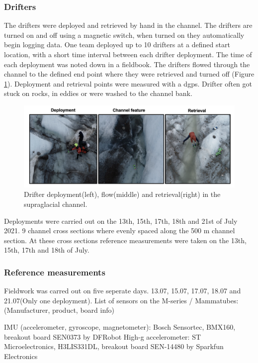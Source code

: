 \subsubsection{Drifters}
The drifters were deployed and retrieved by hand in the channel. The drifters are turned on and off using a magnetic switch, when turned on they automatically begin logging data. One team deployed up to 10 drifters at a defined start location, with a short time interval between each drifter deployment. The time of each deployment was noted down in a fieldbook. The drifters flowed through the channel to the defined end point where they were retrieved and turned off (Figure \ref{fig:deployment_retrieval}). Deployment and retrieval points were measured with a dgps. Drifter often got stuck on rocks, in eddies or were washed to the channel bank.  
\begin{figure}[h]
    \centering
    \includegraphics[width = 12cm]{figures/Methods/deployment_channel_retrieval.png}
    \caption{Drifter deployment(left), flow(middle) and retrieval(right) in the supraglacial channel.}
    \label{fig:deployment_retrieval}
\end{figure}

\newline
\newline

Deployments were carried out on the 13th, 15th, 17th, 18th and 21st of July 2021.
9 channel cross sections where evenly spaced along the 500 m channel section. At these cross sections reference measurements were taken on the 13th, 15th, 17th and 18th of July. 
\subsubsection{Reference measurements}

Fieldwork was carred out on five seperate days. 13.07, 15.07, 17.07, 18.07 and 21.07(Only one deployment).  
List of sensors on the M-series / Mammatubes:
(Manufacturer, product, board info)

IMU (accelerometer, gyroscope, magnetometer): Bosch Sensortec, BMX160, breakout board SEN0373 by DFRobot
High-g accelerometer: ST Microelectronics, H3LIS331DL, breakout board SEN-14480 by Sparkfun Electronics
 

